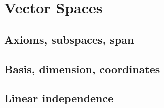 
\section{Vector Spaces}

\subsection{Axioms, subspaces, span}


\subsection{Basis, dimension, coordinates}


\subsection{Linear independence}

